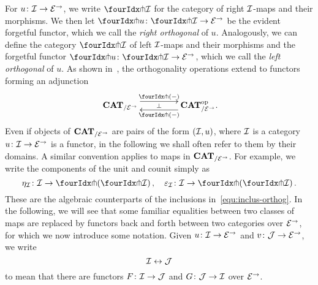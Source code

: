 \documentclass[reqno,10pt,a4paper,oneside,draft]{amsart}
\begin{document}
{{For $u \co \cal{I} \to \catE^\to$, we write $\liftr{\cal{I}}$ for the category of right $\cal{I}$-maps and their morphisms.
We then let $\liftr{u} \co \liftr{\cal{I}} \to \catE^\to$ be the evident forgetful functor, which we call the \emph{right orthogonal} of $u$. Analogously, we can define the category $\liftl{\cal{I}}$  of left $\cal{I}$-maps and their morphisms
and the forgetful functor $\liftl{u} \co \liftl{\cal{I}} \to \cal{E}^\to$, which we call the \emph{left orthogonal} of $u$.
As shown in~\cite[Proposition~3.8]{garner:small-object-argument}, the orthogonality operations
extend to functors forming an adjunction
\begin{equation} \label{garner-adjunction}
\begin{gathered}
\xymatrix@C+2em{
  \CAT_{/\catE^\to}
  \ar@<5pt>[r]^-{\liftl{\brarghole}}
  \ar@{}[r]|-{\bot}
&
  \CAT_{/\catE^\to}^{\op}
  \ar@<5pt>[l]^-{\liftr{\brarghole}}
\rlap{.}}
\end{gathered}
\end{equation}
Even if objects of $\CAT_{/\catE^\to}$ are pairs of the form $(\cal{I}, u)$, where $\cal{I}$ is a category $u \co
\cal{I} \to \catE^\to$ is a functor, in the following we shall often refer to them by their domains.
A similar convention applies to maps in $\CAT_{/\catE^\to}$.
For example, we write the components of the unit and counit simply as
\[
\eta_\cal{I} \co \cal{I} \to \liftl{(\liftr{\cal{I}})}
\, , \quad
\varepsilon_\cal{I} \co \cal{I} \to \liftr{(\liftl{\cal{I}})}
\, .\]
These are the algebraic counterparts of the inclusions in~\eqref{equ:inclus-orthog}.
In the following, we will see that some familiar equalities between two classes of maps are replaced by functors back and forth between two categories over $\cal{E}^\to$, for which we now introduce some notation.
Given $u \co \cal{I} \to \cal{E}^\to$ and $v \co \cal{J} \to \cal{E}^\to$, we write
\begin{equation} \label{equ:logical-equivalence}
\cal{I} \leftrightarrow \cal{J}
\end{equation}
to mean that there are functors $F \co \cal{I} \to \cal{J}$ and $G \co \cal{J} \to \cal{I}$ over $\cal{E}^\to$.

}}
\end{document}
